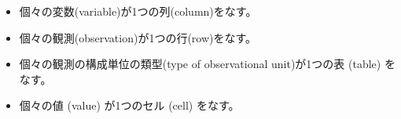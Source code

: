 \begin{itemize}
	\item 個々の変数(variable)が1つの列(column)をなす。
	\item 個々の観測(observation)が1つの行(row)をなす。
	\item 個々の観測の構成単位の類型(type of observational unit)が1つの表 (table) をなす。
	\item 個々の値 (value) が1つのセル (cell) をなす。
\end{itemize}
